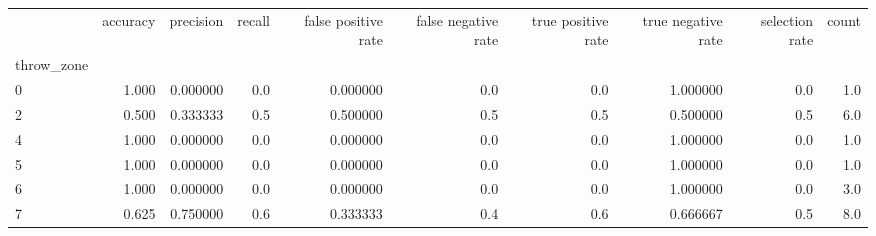 \begin{tabular}{lrrrrrrrrr}
\toprule
{} &  accuracy &  precision &  recall &  false positive rate &  false negative rate &  true positive rate &  true negative rate &  selection rate &  count \\
throw\_zone &           &            &         &                      &                      &                     &                     &                 &        \\
\midrule
0          &     1.000 &   0.000000 &     0.0 &             0.000000 &                  0.0 &                 0.0 &            1.000000 &             0.0 &    1.0 \\
2          &     0.500 &   0.333333 &     0.5 &             0.500000 &                  0.5 &                 0.5 &            0.500000 &             0.5 &    6.0 \\
4          &     1.000 &   0.000000 &     0.0 &             0.000000 &                  0.0 &                 0.0 &            1.000000 &             0.0 &    1.0 \\
5          &     1.000 &   0.000000 &     0.0 &             0.000000 &                  0.0 &                 0.0 &            1.000000 &             0.0 &    1.0 \\
6          &     1.000 &   0.000000 &     0.0 &             0.000000 &                  0.0 &                 0.0 &            1.000000 &             0.0 &    3.0 \\
7          &     0.625 &   0.750000 &     0.6 &             0.333333 &                  0.4 &                 0.6 &            0.666667 &             0.5 &    8.0 \\
\bottomrule
\end{tabular}
